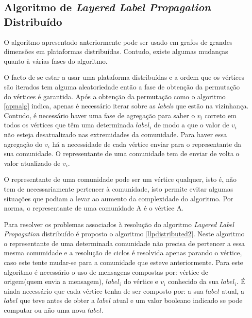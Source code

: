 \subsection{Algoritmo de \textit{Layered Label Propagation} Distribuído}

O algoritmo apresentado anteriormente pode ser usado em grafos de grandes
dimensões em plataformas distribuídas. Contudo, existe algumas mudanças quanto 
à várias fases do algoritmo. 

  O facto de se estar a usar uma plataforma distribuídas e a ordem que os 
vértices são iterados tem alguma aleatoriedade então a fase de obtenção da 
permutação do vértices é garantida. Após a obtenção da permutação como o 
algoritmo \ref{apmalg} indica, apenas é necessário iterar sobre as 
\textit{labels} que estão na vizinhança. Contudo, é necessário haver uma fase 
de agregação para saber o $v_i$ correto em todos os vértices que têm uma 
determinada $label_i$ de modo a que o valor de $v_i$ não esteja desatualizado 
nas extremidades da comunidade. Para haver essa agregação do $v_i$ há a 
necessidade de cada vértice enviar para o representante da sua comunidade. O 
representante de uma comunidade tem de enviar de volta o valor atualizado de 
$v_i$.

O representante de uma comunidade pode ser um vértice qualquer, isto é, não 
tem de necessariamente pertencer à comunidade, isto permite evitar algumas 
situações que podiam a levar ao aumento da complexidade do algoritmo. Por 
norma, o representante de uma comunidade A é o vértice A.

Para resolver os problemas associados à resolução do algoritmo \textit{Layered 
Label Propagation} distribuído é proposto o algoritmo \ref{llpdistributed2}. 
Neste algoritmo o representante de uma determinada comunidade não precisa de 
pertencer a essa mesma comunidade e a resolução de ciclos é resolvida apenas 
parando o vértice, caso este tente mudar-se para a comunidade que esteve 
anteriormente. Para este algoritmo é necessário o uso de mensagens compostas 
por: vértice de origem(quem envia a mensagem), $label_i$ do vértice e $v_i$ 
conhecido da sua $label_i$. É ainda necessário que cada vértice tenha de ser 
composto por: a sua $label$ atual, a $label$ que teve antes de obter a $label$ 
atual e um valor booleano indicado se pode computar ou não uma nova $label$.

